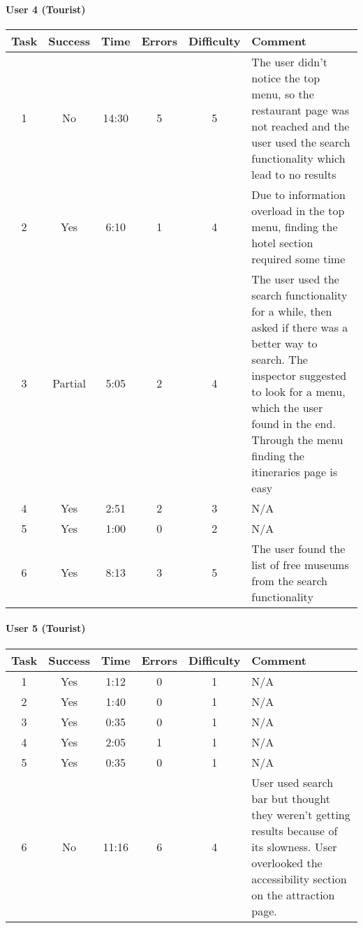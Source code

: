 \begin{small}
\paragraph{User 4 (Tourist)}
\begin{tabularx}{\linewidth}{c c c c c X}
    \toprule
    \textbf{Task} & \textbf{Success} & \textbf{Time}
     & \textbf{Errors} & \textbf{Difficulty} & \textbf{Comment} \\
    \midrule
    1 & No & 14:30 & 5 & 5 & The user didn't notice the top menu, so the restaurant page was not reached and the user used the search functionality which lead to no results \\ \midrule
    2 & Yes & 6:10 & 1 & 4 & Due to information overload in the top menu, finding the hotel section required some time \\ \midrule
    3 & Partial & 5:05 & 2 & 4 & The user used the search functionality for a while, then asked if there was a better way to search. The inspector suggested to look for a menu, which the user found in the end. Through the menu finding the itineraries page is easy \\ \midrule
    4 & Yes & 2:51 & 2 & 3 & N/A \\ \midrule
    5 & Yes & 1:00 & 0 & 2 & N/A \\ \midrule
    6 & Yes & 8:13 & 3 & 5 & The user found the list of free museums from the search functionality \\ \bottomrule
\end{tabularx}

\paragraph{User 5 (Tourist)}
\begin{tabularx}{\linewidth}{c c c c c X}
    \toprule
    \textbf{Task} & \textbf{Success} & \textbf{Time}
     & \textbf{Errors} & \textbf{Difficulty} & \textbf{Comment} \\
    \midrule
    1 & Yes & 1:12 & 0 & 1 & N/A \\ \midrule
    2 & Yes & 1:40 & 0 & 1 & N/A \\ \midrule
    3 & Yes & 0:35 & 0 & 1 & N/A \\ \midrule
    4 & Yes & 2:05 & 1 & 1 & N/A \\ \midrule
    5 & Yes & 0:35 & 0 & 1 & N/A \\ \midrule
    6 & No & 11:16 & 6 & 4 & User used search bar but thought they weren't getting results because of its slowness. User overlooked the accessibility section on the attraction page. \\ \bottomrule
\end{tabularx}


\end{small}
